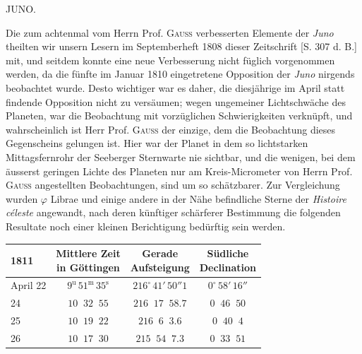 \par{}\bigskip
\hypertarget{native-335-lower}{}\label{native-335-lower}
\begin{center}
\large JUNO.
\end{center}

\par\indent Die zum achtenmal vom Herrn Prof. \textsc{Gauss} verbesserten Elemente der \emph{Juno} theilten wir unsern Lesern im Septemberheft 1808 dieser Zeitschrift [S. 307 d. B.] mit, und seitdem konnte eine neue Verbesserung nicht füglich vorgenommen werden, da die fünfte im Januar 1810 eingetretene Opposition der \emph{Juno} nirgends beobachtet wurde. Desto wichtiger war es daher, die diesjährige im April statt findende Opposition nicht zu versäumen; wegen ungemeiner Lichtschwäche des Planeten, war die Beobachtung mit vorzüglichen Schwierigkeiten verknüpft, und wahrscheinlich ist Herr Prof. \textsc{Gauss} der einzige, dem die Beobachtung dieses Gegenscheins gelungen ist. Hier war der Planet in dem so lichtstarken Mittagsfernrohr der Seeberger Sternwarte nie sichtbar, und die wenigen, bei dem äusserst geringen Lichte des Planeten nur am Kreis-Micrometer von Herrn Prof. \textsc{Gauss} angestellten Beobachtungen, sind um so schätzbarer. Zur Vergleichung wurden $\varphi$ Librae und einige andere in der Nähe befindliche Sterne der \emph{Histoire céleste} angewandt, nach deren künftiger schärferer Bestimmung die folgenden Resultate noch einer kleinen Berichtigung bedürftig sein werden.
\begin{center}\fontsize{10}{12}\selectfont\setlength{\tabcolsep}{4pt}\renewcommand{\arraystretch}{1.15}
\begin{tabular}{l|c|c|c}
1811 & \shortstack{Mittlere Zeit\\in Göttingen} & \shortstack{Gerade\\Aufsteigung} & \shortstack{Südliche\\Declination} \\
\hline
April 22 & $9^{\mathrm u}\,51^{\mathrm m}\,35^{\mathrm s}$ & $216^\circ\,41'\,50''1$ & $0^\circ\,58'\,16''$ \\
\phantom{April }24 & $10\;\;32\;\;55$ & $216\;\;17\;\;58.7$ & $0\;\;46\;\;50$ \\
\phantom{April }25 & $10\;\;19\;\;22$ & $216\;\;6\;\;3.6$ & $0\;\;40\;\;4$ \\
\phantom{April }26 & $10\;\;17\;\;30$ & $215\;\;54\;\;7.3$ & $0\;\;33\;\;51$ \\
\end{tabular}
\end{center}


